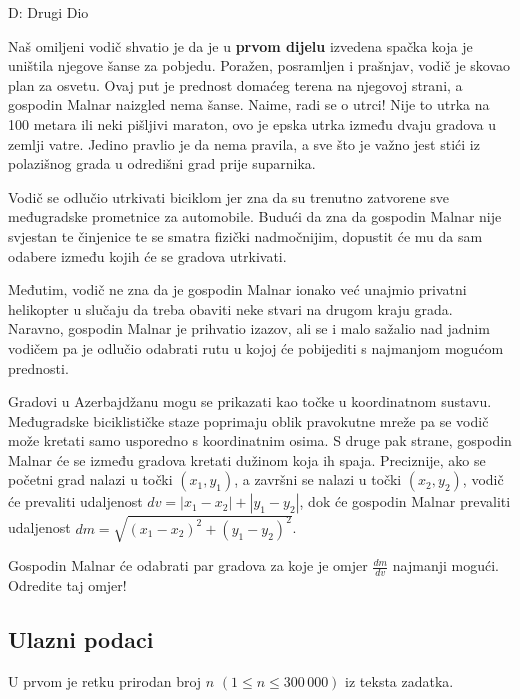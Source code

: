 \begin{statement}[
  timelimit=1 s,
  memorylimit=512 MiB,
]{D: Drugi Dio}

Naš omiljeni vodič shvatio je da je u \textbf{prvom dijelu} izvedena spačka
koja je uništila njegove šanse za pobjedu. Poražen, posramljen i prašnjav,
vodič je skovao plan za osvetu. Ovaj put je prednost domaćeg terena na njegovoj
strani, a gospodin Malnar naizgled nema šanse. Naime, radi se o utrci!
Nije to utrka na 100 metara ili neki pišljivi maraton, ovo je epska utrka
između dvaju gradova u zemlji vatre. Jedino pravlio je da nema pravila, a sve
što je važno jest stići iz polazišnog grada u odredišni grad prije suparnika.

Vodič se odlučio utrkivati biciklom jer zna da su trenutno zatvorene sve
međugradske prometnice za automobile. Budući da zna da gospodin Malnar nije
svjestan te činjenice te se smatra fizički nadmočnijim, dopustit će mu da sam
odabere između kojih će se gradova utrkivati.

Međutim, vodič ne zna da je gospodin Malnar ionako već unajmio privatni
helikopter u slučaju da treba obaviti neke stvari na drugom kraju grada.
Naravno, gospodin Malnar je prihvatio izazov, ali se i malo sažalio nad
jadnim vodičem pa je odlučio odabrati rutu u kojoj će pobijediti s najmanjom
mogućom prednosti.

Gradovi u Azerbajdžanu mogu se prikazati kao točke u koordinatnom sustavu.
Međugradske biciklističke staze poprimaju oblik pravokutne mreže pa se vodič
može kretati samo usporedno s koordinatnim osima. S druge pak strane,
gospodin Malnar će se između gradova kretati dužinom koja ih spaja.
Preciznije, ako se početni grad nalazi u točki $(x_1, y_1)$, a završni se
nalazi u točki $(x_2, y_2)$, vodič će prevaliti udaljenost $dv = |x_1 - x_2|
+ |y_1 - y_2|$, dok će gospodin Malnar prevaliti udaljenost $dm =
\sqrt{(x_1-x_2)^2 + (y_1-y_2)^2}$.

Gospodin Malnar će odabrati par gradova za koje je omjer $\frac{dm}{dv}$
najmanji mogući. Odredite taj omjer!

\subsection*{Ulazni podaci}
U prvom je retku prirodan broj $n$ $(1 \le n \le 300\,000)$ iz teksta
zadatka.


\end{statement}
